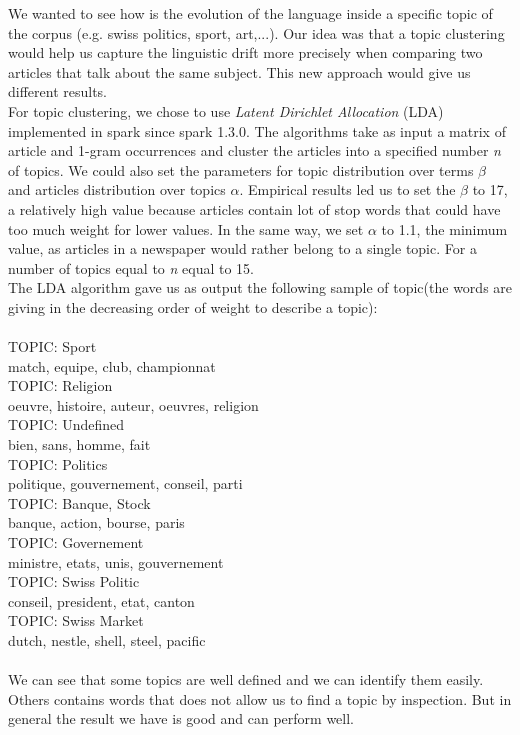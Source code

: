 We wanted to see how is the evolution of the language inside a specific topic of the corpus (e.g. swiss politics, sport, art,...).	
Our idea was that a topic clustering would help us capture the linguistic drift more precisely when comparing two articles that talk about the same subject.
This new approach would give us different results.\\
For topic clustering, we chose to use \emph{Latent Dirichlet Allocation} (LDA) implemented in spark since spark 1.3.0. 
The algorithms take as input a matrix of article and 1-gram occurrences and cluster the articles into a specified number \textit{n} of topics. We could also set the parameters for topic distribution over terms $\beta$ and articles distribution over topics $\alpha$. Empirical results led us to set the $\beta$ to 17, a relatively high value because articles contain lot of stop words that could have too much weight for lower values. In the same way, we set $\alpha$ to 1.1, the minimum value, as articles in a newspaper would rather belong to a single topic. For a number of topics equal to \textit{n} equal to 15.\\
The LDA algorithm gave us as output the following sample of topic(the words are giving in the decreasing order of weight to describe a topic):\\
\\
TOPIC: Sport\\
match, equipe, club, championnat\\
TOPIC: Religion\\
oeuvre, histoire, auteur, oeuvres, religion\\
TOPIC: Undefined\\
bien, sans, homme, fait\\
TOPIC: Politics\\
politique, gouvernement, conseil, parti\\
TOPIC: Banque, Stock\\
banque, action, bourse, paris\\
TOPIC: Governement\\
ministre, etats, unis, gouvernement\\
TOPIC: Swiss Politic\\
conseil, president, etat, canton\\
TOPIC: Swiss Market\\
dutch, nestle, shell, steel, pacific\\
\\
We can see that some topics are well defined and we can identify them easily. Others contains words that does not allow us to find a topic by inspection. But in general the result we have is good and can perform well.

